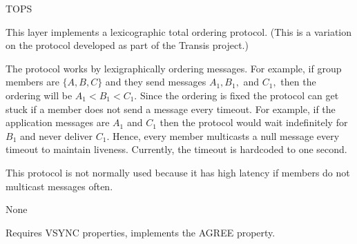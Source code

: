 \begin{Layer}{TOPS}

This layer implements a lexicographic total ordering protocol.  (This is
a variation on the protocol developed as part of the Transis project.)

\begin{Protocol}
The protocol works by lexigraphically ordering messages. For example,
if group members are $\{ A, B, C \}$ and they send messages $A_1,
B_1,$ and $C_1,$ then the ordering will be $A_1 < B_1 < C_1$. Since
the ordering is fixed the protocol can get stuck if a member does not
send a message every timeout. For example, if the application messages
are $A_1$ and $C_1$ then the protocol would wait indefinitely for
$B_1$ and never deliver $C_1$. Hence, every member multicasts a null
message every timeout to maintain liveness. Currently, the timeout is
hardcoded to one second.

This protocol is not normally used because it has high latency 
if members do not multicast messages often. 
\end{Protocol}

\begin{Parameters}
\item None
\end{Parameters}

\begin{Properties}
\item
Requires VSYNC properties, implements the AGREE property. 
\end{Properties}

\begin{Sources}
\end{Sources}

\end{Layer}